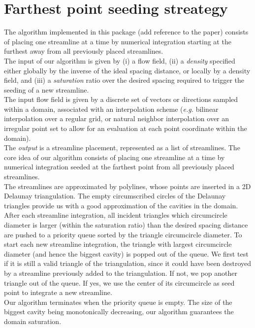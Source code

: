 \section{Farthest point seeding streategy}
\label{Section_2D_Streamlines_Strategy}
The algorithm implemented in this package (add reference to the paper) consists of placing
one streamline at a time by numerical integration starting at the furthest away
from all previously placed streamlines.\\The input of our algorithm is given by
(i) a flow field, (ii) a \textit{density} specified either globally by the
inverse of the ideal spacing distance, or locally by a density field, and (iii)
a \textit{saturation} ratio over the desired spacing required to trigger the
seeding of a new streamline.\\The input flow field is given by a discrete set of
vectors or directions sampled within a domain, associated with an interpolation
scheme (\textit{e.g.} bilinear interpolation over a regular grid, or natural
neighbor interpolation over an irregular point set to
allow for an evaluation at each point coordinate within the domain).\\The
\textit{output} is a streamline placement, represented as a list of streamlines.
The core idea of our algorithm consists of placing one streamline at a time by
numerical integration seeded at the farthest point from all previously placed
streamlines.\\The streamlines are approximated by polylines, whose points are
inserted in a 2D Delaunay triangulation. The empty circumscribed circles of the
Delaunay triangles provide us with a good approximation of the cavities in the
domain.\\After each streamline integration, all incident triangles which
circumcircle diameter is larger (within the saturation ratio) than the desired
spacing distance are pushed to a priority queue sorted by the triangle
circumcircle diameter. To start each new streamline integration, the triangle
with largest circumcircle diameter (and hence the biggest cavity) is popped out
of the queue. We first test if it is still a valid triangle of the
triangulation, since it could have been destroyed by a streamline previously
added to the triangulation. If not, we pop another triangle out of the queue. If
yes, we use the center of its circumcircle as seed point to integrate a new
streamline.\\Our algorithm terminates when the priority queue is empty. The size
of the biggest cavity being monotonically decreasing, our algorithm guarantees
the domain saturation.

